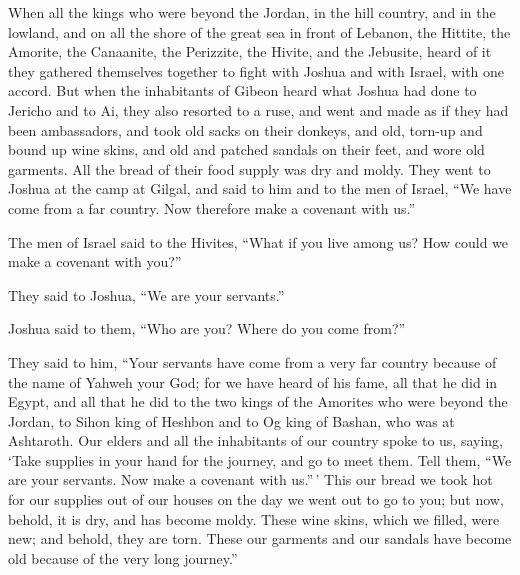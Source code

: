  When all the kings who were beyond the Jordan, in the hill
country, and in the lowland, and on all the shore of the great sea in
front of Lebanon, the Hittite, the Amorite, the Canaanite, the
Perizzite, the Hivite, and the Jebusite, heard of it  they
gathered themselves together to fight with Joshua and with Israel, with
one accord.  But when the inhabitants of Gibeon heard what
Joshua had done to Jericho and to Ai,  they also resorted to
a ruse, and went and made as if they had been ambassadors, and took old
sacks on their donkeys, and old, torn-up and bound up wine skins,
 and old and patched sandals on their feet, and wore old
garments. All the bread of their food supply was dry and moldy.
 They went to Joshua at the camp at Gilgal, and said to him
and to the men of Israel, ``We have come from a far country. Now
therefore make a covenant with us.''

 The men of Israel said to the Hivites, ``What if you live
among us? How could we make a covenant with you?''

 They said to Joshua, ``We are your servants.''

Joshua said to them, ``Who are you? Where do you come from?''

 They said to him, ``Your servants have come from a very far
country because of the name of Yahweh your God; for we have heard of his
fame, all that he did in Egypt,  and all that he did to the
two kings of the Amorites who were beyond the Jordan, to Sihon king of
Heshbon and to Og king of Bashan, who was at Ashtaroth. 
Our elders and all the inhabitants of our country spoke to us, saying,
`Take supplies in your hand for the journey, and go to meet them. Tell
them, ``We are your servants. Now make a covenant with us.''\,'
 This our bread we took hot for our supplies out of our
houses on the day we went out to go to you; but now, behold, it is dry,
and has become moldy.  These wine skins, which we filled,
were new; and behold, they are torn. These our garments and our sandals
have become old because of the very long journey.''

